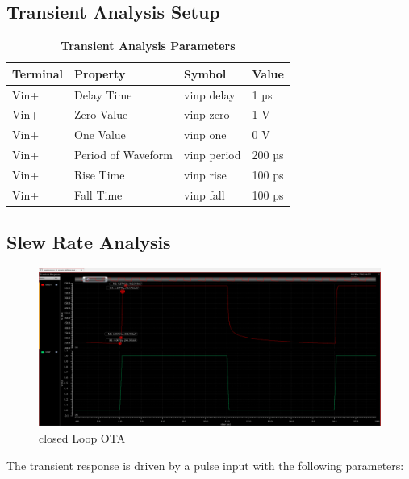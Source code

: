 \subsection{Transient Analysis Setup}

\begin{table}[h]
    \centering
    \captionsetup{justification=centering} %
    \caption*{\textbf{Transient Analysis Parameters}} %
    \begin{tabular}{l l l l}
        \toprule
        Terminal & Property & Symbol & Value \\
        \midrule
        Vin+ & Delay Time & vinp delay & 1 µs \\
        Vin+ & Zero Value & vinp zero & 1 V \\
        Vin+ & One Value & vinp one & 0 V \\
        Vin+ & Period of Waveform & vinp period & 200 µs \\
        Vin+ & Rise Time & vinp rise & 100 ps \\
        Vin+ & Fall Time & vinp fall & 100 ps \\
        \bottomrule
    \end{tabular}
    \label{tab:transient_analysis}
\end{table}


\subsection{Slew Rate Analysis}
    \begin{figure}[h]
        \centering
           \includegraphics[width=1\textwidth]{images/single_ota_slew_close.png}
        \caption{closed Loop OTA}
        \label{fig: }
    \end{figure}

The transient response is driven by a pulse input with the following parameters:

